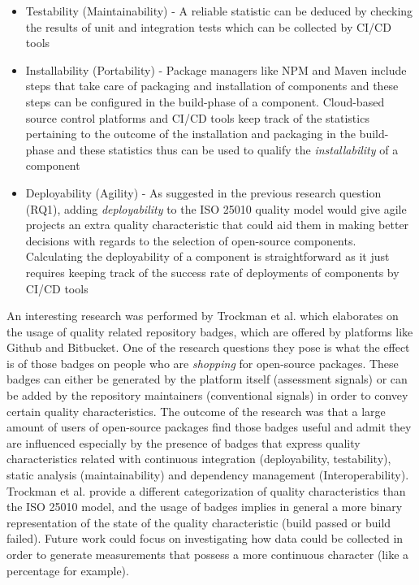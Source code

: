 \documentclass[a4paper, 10pt, conference]{ieeeconf}
\begin{document}
\begin{itemize}
  \item Testability (Maintainability) - A reliable statistic can be deduced by checking the results of unit and integration tests which can be collected by CI/CD tools
  \item Installability (Portability) - Package managers like NPM and Maven include steps that take care of packaging and installation of components and these steps can be configured in the build-phase of a component. Cloud-based source control platforms and CI/CD tools keep track of the statistics pertaining to the outcome of the installation and packaging in the build-phase and these statistics thus can be used to qualify the \textit{installability} of a component
  \item Deployability (Agility) - As suggested in the previous research question (RQ1), adding \textit{deployability} to the ISO 25010 quality model would give agile projects an extra quality characteristic that could aid them in making better decisions with regards to the selection of open-source components. Calculating the deployability of a component is straightforward as it just requires keeping track of the success rate of deployments of components by CI/CD tools
\end{itemize}

\vspace{3 mm}

An interesting research was performed by Trockman et al. \cite{trockman2018} which elaborates on the usage of quality related repository badges, which are offered by platforms like Github and Bitbucket. One of the research questions they pose is what the effect is of those badges on people who are \textit{shopping} for open-source packages. These badges can either be generated by the platform itself (assessment signals) or can be added by the repository maintainers (conventional signals) in order to convey certain quality characteristics. The outcome of the research was that a large amount of users of open-source packages find those badges useful and admit they are influenced especially by the presence of badges that express quality characteristics related with continuous integration (deployability, testability), static analysis (maintainability) and dependency management (Interoperability). Trockman et al. provide a different categorization of quality characteristics than the ISO 25010 model, and the usage of badges implies in general a more binary representation of the state of the quality characteristic (build passed or build failed). Future work could focus on investigating how data could be collected in order to generate measurements that possess a more continuous character (like a percentage for example).
\end{document}
